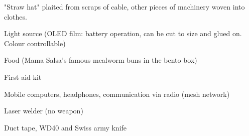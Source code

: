 \newpage
\begin{npcBox}[title=Spark continued]
    \begin{npcDescription}
    "Straw hat" plaited from scraps of cable, other pieces of machinery woven into clothes.
    \end{npcDescription}


    \begin{equipment}
    \item Light source (OLED film: battery operation, can be cut to size and glued on. Colour controllable)
    \item Food (Mama Salsa's famous mealworm buns in the bento box)
    \item First aid kit
    \item Mobile computers, headphones, communication via radio (mesh network)
    \item Laser welder (no weapon)
    \item Duct tape, WD40 and Swiss army knife
    \end{equipment}
\end{npcBox}
